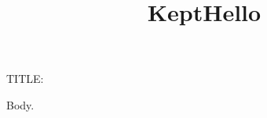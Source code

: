 \documentclass{article}
\title{Kept}
\makeatletter
\renewcommand*{\maketitle}[1][]{\begingroup\title{#1}\par TITLE: \@title\par\endgroup}
\makeatother
\begin{document}
\maketitle[Hello]
Body.
\end{document}
